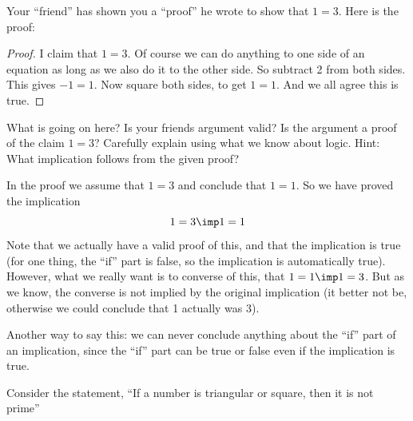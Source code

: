 \begin{questions}
\begin{parts}
  \end{parts}



  \question[4] Your ``friend'' has shown you a ``proof'' he wrote to show that $1 = 3$.  Here is the proof:

  \begin{proof}
  I claim that $1 = 3$.  Of course we can do anything to one side of an equation as long as we also do it to the other side.  So subtract 2 from both sides.  This gives $-1 = 1$.  Now square both sides, to get $1 = 1$.  And we all agree this is true.
  \end{proof}

  What is going on here?  Is your friends argument valid?  Is the argument a proof of the claim $1=3$?  Carefully explain using what we know about logic.  Hint: What implication follows from the given proof?

  \begin{solution}
  In the proof we assume that $1=3$ and conclude that $1=1$.  So we have proved the implication
  \[1=3 \imp 1=1\]
  Note that we actually have a valid proof of this, and that the implication is true (for one thing, the ``if'' part is false, so the implication is automatically true).  However, what we really want is to converse of this, that $1=1 \imp 1=3$.  But as we know, the converse is not implied by the original implication (it better not be, otherwise we could conclude that 1 actually was 3).

  Another way to say this: we can never conclude anything about the ``if'' part of an implication, since the ``if'' part can be true or false even if the implication is true.
  \end{solution}


  \question[6] Consider the statement, ``If a number is triangular or square, then it is not prime''


\end{questions}
